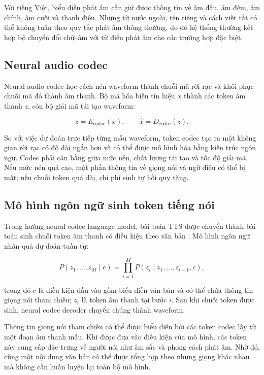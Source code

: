 \documentclass[a4paper,13pt,oneside]{report}
\begin{document}
Với tiếng Việt, biểu diễn phát âm cần giữ được thông tin về âm đầu, âm đệm, âm chính, âm cuối và thanh điệu. Những từ nước ngoài, tên riêng và cách viết tắt có thể không tuân theo quy tắc phát âm thông thường, do đó hệ thống thường kết hợp bộ chuyển đổi chữ--âm với từ điển phát âm cho các trường hợp đặc biệt.

\subsection{Neural audio codec}

Neural audio codec học cách nén waveform thành chuỗi mã rời rạc và khôi phục chuỗi mã đó thành âm thanh. Bộ mã hóa biến tín hiệu \(x\) thành các token âm thanh \(z\), còn bộ giải mã tái tạo waveform:

\begin{equation}
    z = E_{\mathrm{codec}}(x),
    \qquad
    \hat{x} = D_{\mathrm{codec}}(z).
\end{equation}

So với việc dự đoán trực tiếp từng mẫu waveform, token codec tạo ra một không gian rời rạc có độ dài ngắn hơn và có thể được mô hình hóa bằng kiến trúc ngôn ngữ. Codec phải cân bằng giữa mức nén, chất lượng tái tạo và tốc độ giải mã. Nếu mức nén quá cao, một phần thông tin về giọng nói và ngữ điệu có thể bị mất; nếu chuỗi token quá dài, chi phí sinh tự hồi quy tăng.

\subsection{Mô hình ngôn ngữ sinh token tiếng nói}

Trong hướng neural codec language model, bài toán TTS được chuyển thành bài toán sinh chuỗi token âm thanh có điều kiện theo văn bản \cite{valle}. Mô hình ngôn ngữ nhân quả dự đoán tuần tự:

\begin{equation}
    P(z_1,\ldots,z_M \mid c)
    =
    \prod_{i=1}^{M}
    P(z_i \mid z_1,\ldots,z_{i-1},c),
\end{equation}

trong đó \(c\) là điều kiện đầu vào gồm biểu diễn văn bản và có thể chứa thông tin giọng nói tham chiếu; \(z_i\) là token âm thanh tại bước \(i\). Sau khi chuỗi token được sinh, neural codec decoder chuyển chúng thành waveform.

Thông tin giọng nói tham chiếu có thể được biểu diễn bởi các token codec lấy từ một đoạn âm thanh mẫu. Khi được đưa vào điều kiện của mô hình, các token này cung cấp đặc trưng về người nói như âm sắc và phong cách phát âm. Nhờ đó, cùng một nội dung văn bản có thể được tổng hợp theo những giọng khác nhau mà không cần huấn luyện lại toàn bộ mô hình.
\end{document}
